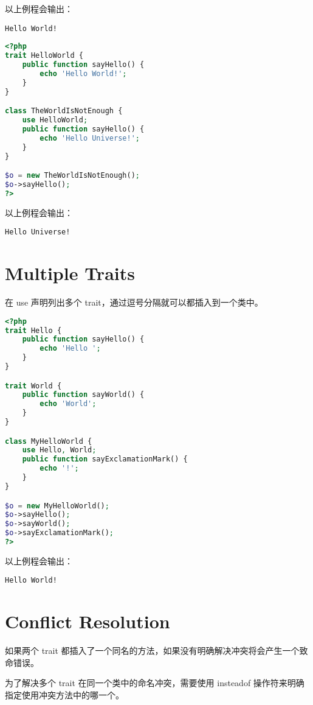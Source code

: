 以上例程会输出：

\begin{verbatim}
Hello World!
\end{verbatim}

\begin{lstlisting}[language=PHP]
<?php
trait HelloWorld {
    public function sayHello() {
        echo 'Hello World!';
    }
}

class TheWorldIsNotEnough {
    use HelloWorld;
    public function sayHello() {
        echo 'Hello Universe!';
    }
}

$o = new TheWorldIsNotEnough();
$o->sayHello();
?>
\end{lstlisting}


以上例程会输出：

\begin{verbatim}
Hello Universe!
\end{verbatim}

\section{Multiple Traits}


在 use 声明列出多个 trait，通过逗号分隔就可以都插入到一个类中。

\begin{lstlisting}[language=PHP]
<?php
trait Hello {
    public function sayHello() {
        echo 'Hello ';
    }
}

trait World {
    public function sayWorld() {
        echo 'World';
    }
}

class MyHelloWorld {
    use Hello, World;
    public function sayExclamationMark() {
        echo '!';
    }
}

$o = new MyHelloWorld();
$o->sayHello();
$o->sayWorld();
$o->sayExclamationMark();
?>
\end{lstlisting}

以上例程会输出：

\begin{verbatim}
Hello World!
\end{verbatim}



\section{Conflict Resolution}

如果两个 trait 都插入了一个同名的方法，如果没有明确解决冲突将会产生一个致命错误。

为了解决多个 trait 在同一个类中的命名冲突，需要使用 insteadof 操作符来明确指定使用冲突方法中的哪一个。

